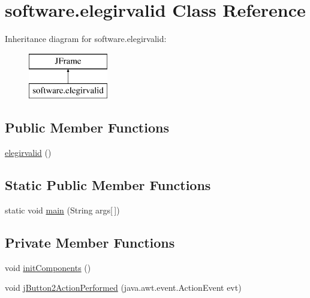 \hypertarget{classsoftware_1_1elegirvalid}{}\section{software.\+elegirvalid Class Reference}
\label{classsoftware_1_1elegirvalid}
Inheritance diagram for software.\+elegirvalid\+:\begin{figure}[H]
\begin{center}
\leavevmode
\includegraphics[height=2.000000cm]{classsoftware_1_1elegirvalid}
\end{center}
\end{figure}
\subsection*{Public Member Functions}
\begin{DoxyCompactItemize}
\item 
\mbox{\hyperlink{classsoftware_1_1elegirvalid_a6b0b84f3a6730a79b6feb0684e6f54e6}{elegirvalid}} ()
\end{DoxyCompactItemize}
\subsection*{Static Public Member Functions}
\begin{DoxyCompactItemize}
\item 
static void \mbox{\hyperlink{classsoftware_1_1elegirvalid_a186a61a4379c8e9572d90605f1fa2f77}{main}} (String args\mbox{[}$\,$\mbox{]})
\end{DoxyCompactItemize}
\subsection*{Private Member Functions}
\begin{DoxyCompactItemize}
\item 
void \mbox{\hyperlink{classsoftware_1_1elegirvalid_a82dfc7ee539e30a0864221d3e6e5f58e}{init\+Components}} ()
\item 
void \mbox{\hyperlink{classsoftware_1_1elegirvalid_a65e2a0fb21c23474d57dba8d86811782}{j\+Button2\+Action\+Performed}} (java.\+awt.\+event.\+Action\+Event evt)
\end{DoxyCompactItemize}
